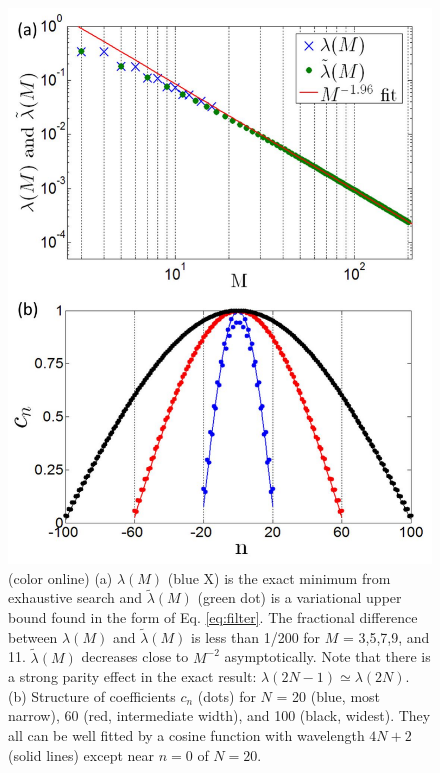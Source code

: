 \documentclass[twocolumn,superscriptaddress, prb]{revtex4-1}
\begin{document}
%


\begin{figure}
\includegraphics[width=0.95\linewidth]{fig_floquet.pdf}
\centering
\caption{(color online) (a) $\lambda(M)$ (blue X) is the exact minimum from exhaustive search and $\tilde{\lambda}(M)$ (green dot) is a variational upper bound found in the form of Eq. \eqref{eq:filter}. The fractional difference between $\lambda(M)$ and $\tilde{\lambda}(M)$ is less than 1/200 for $M$ = 3,5,7,9, and 11. $\tilde{\lambda}(M)$ decreases close to $M^{-2}$ asymptotically. Note that there is a strong parity effect in the exact result: $\lambda(2N-1) \simeq \lambda(2N)$.
(b) Structure of coefficients $c_n$ (dots) for $N$ = 20 (blue, most narrow), 60 (red, intermediate width), and 100 (black, widest). They all can be well fitted by a cosine function with wavelength $4N+2$ (solid lines) except near $n = 0$ of $N = 20$. }
\label{fig:floquet}
\end{figure}
\end{document}
